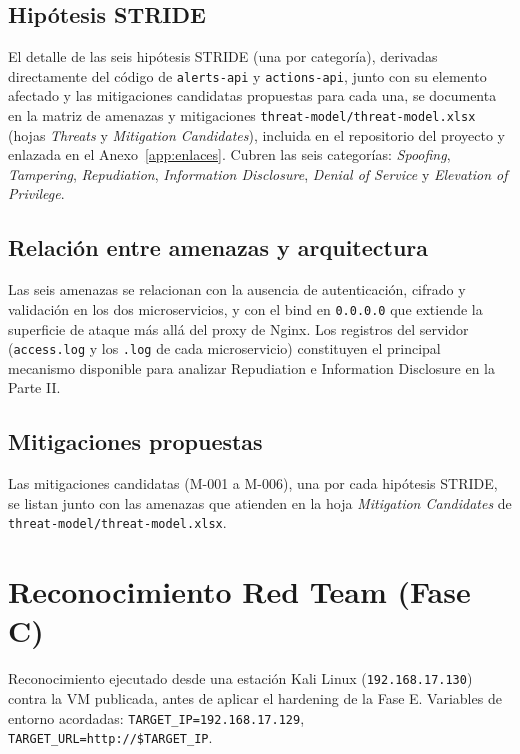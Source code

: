 \documentclass[journal]{IEEEtran}
\begin{document}
\subsection{Hipótesis STRIDE}

El detalle de las seis hipótesis STRIDE (una por categoría), derivadas
directamente del código de \texttt{alerts-api} y \texttt{actions-api}, junto
con su elemento afectado y las mitigaciones candidatas propuestas para cada
una, se documenta en la matriz de amenazas y mitigaciones
\texttt{threat-model/threat-model.xlsx} (hojas \textit{Threats} y
\textit{Mitigation Candidates}), incluida en el repositorio del proyecto y
enlazada en el Anexo~\ref{app:enlaces}.
Cubren las seis categorías: \textit{Spoofing}, \textit{Tampering},
\textit{Repudiation}, \textit{Information Disclosure}, \textit{Denial of
Service} y \textit{Elevation of Privilege}.

\subsection{Relación entre amenazas y arquitectura}

Las seis amenazas se relacionan con la ausencia de autenticación, cifrado y
validación en los dos microservicios, y con el bind en \texttt{0.0.0.0} que
extiende la superficie de ataque más allá del proxy de Nginx. Los registros
del servidor (\texttt{access.log} y los \texttt{.log} de cada microservicio)
constituyen el principal mecanismo disponible para analizar Repudiation e
Information Disclosure en la Parte II.

\subsection{Mitigaciones propuestas}

Las mitigaciones candidatas (M-001 a M-006), una por cada hipótesis STRIDE,
se listan junto con las amenazas que atienden en la hoja \textit{Mitigation
Candidates} de \texttt{threat-model/threat-model.xlsx}.

\section{Reconocimiento Red Team (Fase C)}
\label{sec:redteam}

Reconocimiento ejecutado desde una estación Kali Linux (\texttt{192.168.17.130})
contra la VM publicada, antes de aplicar el hardening de la Fase E. Variables
de entorno acordadas: \texttt{TARGET\_IP=192.168.17.129},
\texttt{TARGET\_URL=http://\$TARGET\_IP}.
\end{document}
